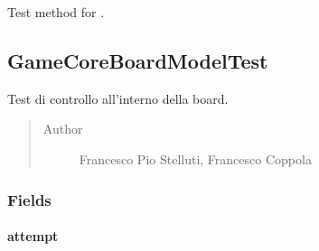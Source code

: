 \documentclass[letterpaper,10pt,italian]{sphinxmanual}
\begin{document}
\begin{fulllineitems}
\label{\detokenize{test/it/unicam/cs/pa/mastermind/test/GameCoreBoardControllerTest:it.unicam.cs.pa.mastermind.test.GameCoreBoardControllerTest.testInsertNewAttempt()}}
Test method for .

\end{fulllineitems}



\subsection{GameCoreBoardModelTest}
\label{\detokenize{test/it/unicam/cs/pa/mastermind/test/GameCoreBoardModelTest:gamecoreboardmodeltest}}\label{\detokenize{test/it/unicam/cs/pa/mastermind/test/GameCoreBoardModelTest::doc}}

\begin{fulllineitems}
\label{\detokenize{test/it/unicam/cs/pa/mastermind/test/GameCoreBoardModelTest:it.unicam.cs.pa.mastermind.test.GameCoreBoardModelTest}}
Test di controllo all’interno della board.
\begin{quote}\begin{description}
\item[{Author}] \leavevmode
Francesco Pio Stelluti, Francesco Coppola

\end{description}\end{quote}

\end{fulllineitems}



\subsubsection{Fields}
\label{\detokenize{test/it/unicam/cs/pa/mastermind/test/GameCoreBoardModelTest:fields}}

\paragraph{attempt}
\label{\detokenize{test/it/unicam/cs/pa/mastermind/test/GameCoreBoardModelTest:attempt}}
\end{document}
